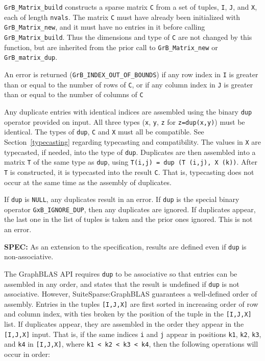 \documentclass[12pt]{article}
\begin{document}
\verb'GrB_Matrix_build' constructs a sparse matrix \verb'C' from a set of
tuples, \verb'I', \verb'J', and \verb'X', each of length \verb'nvals'.  The
matrix \verb'C' must have already been initialized with \verb'GrB_Matrix_new',
and it must have no entries in it before calling \verb'GrB_Matrix_build'.  Thus
the dimensions and type of \verb'C' are not changed by this function, but are
inherited from the prior call to \verb'GrB_Matrix_new' or
\verb'GrB_matrix_dup'.

An error is returned (\verb'GrB_INDEX_OUT_OF_BOUNDS') if any row index in
\verb'I' is greater than or equal to the number of rows of \verb'C', or if any
column index in \verb'J' is greater than or equal to the number of columns of
\verb'C'

Any duplicate entries with identical indices are assembled using the binary
\verb'dup' operator provided on input.  All three types (\verb'x', \verb'y',
\verb'z' for \verb'z=dup(x,y)') must be identical.  The types of \verb'dup',
\verb'C' and \verb'X' must all be compatible.  See Section~\ref{typecasting}
regarding typecasting and compatibility.  The values in \verb'X' are
typecasted, if needed, into the type of \verb'dup'.  Duplicates are then
assembled into a matrix \verb'T' of the same type as \verb'dup', using
\verb'T(i,j) = dup (T (i,j), X (k))'.  After \verb'T' is constructed, it is
typecasted into the result \verb'C'.  That is, typecasting does not occur at
the same time as the assembly of duplicates.

If \verb'dup' is \verb'NULL', any duplicates result in an error.
If \verb'dup' is the special binary operator \verb'GxB_IGNORE_DUP', then
any duplicates are ignored.  If duplicates appear, the last one in the
list of tuples is taken and the prior ones ignored.  This is not an error.

\begin{alert}
{\bf SPEC:} As an extension to the specification, results are defined even if \verb'dup'
is non-associative.
\end{alert}

The GraphBLAS API requires \verb'dup' to be associative so
that entries can be assembled in any order, and states that the result is
undefined if \verb'dup' is not associative.  However, SuiteSparse:GraphBLAS
guarantees a well-defined order of assembly.  Entries in the tuples
\verb'[I,J,X]' are first sorted in increasing order of row and column index,
with ties broken by the position of the tuple in the \verb'[I,J,X]' list.  If
duplicates appear, they are assembled in the order they appear in the
\verb'[I,J,X]' input.  That is, if the same indices \verb'i' and \verb'j'
appear in positions \verb'k1', \verb'k2', \verb'k3', and \verb'k4' in
\verb'[I,J,X]', where \verb'k1 < k2 < k3 < k4', then the following operations
will occur in order:
\end{document}
